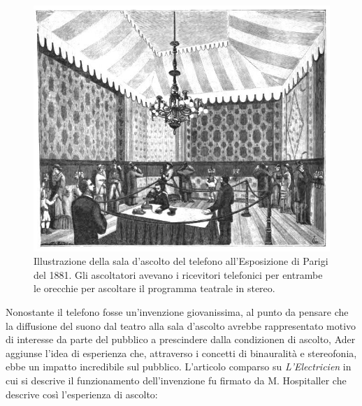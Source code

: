 \begin{figure}[t]
\centering
\includegraphics[width=0.99\columnwidth]{CAPITOLI/1000/IMG/1881opr4.jpg}
\caption[]{Illustrazione della sala d'ascolto del telefono all'Esposizione di
Parigi del 1881. Gli ascoltatori avevano i ricevitori telefonici per entrambe
le orecchie per ascoltare il programma teatrale in stereo.}
\label{fig:teatrophone2}
\end{figure}

Nonostante il telefono fosse un'invenzione giovanissima, al punto da pensare che
la diffusione del suono dal teatro alla sala d'ascolto avrebbe rappresentato
motivo di interesse da parte del pubblico a prescindere dalla condizionen di
ascolto, Ader aggiunse l'idea di esperienza che, attraverso i concetti di
binauralità e stereofonia, ebbe un impatto incredibile sul pubblico. L'articolo
comparso su \emph{L'Electricien} in cui si descrive il funzionamento
dell'invenzione fu firmato da M. Hospitaller che descrive così l'esperienza di
ascolto:

